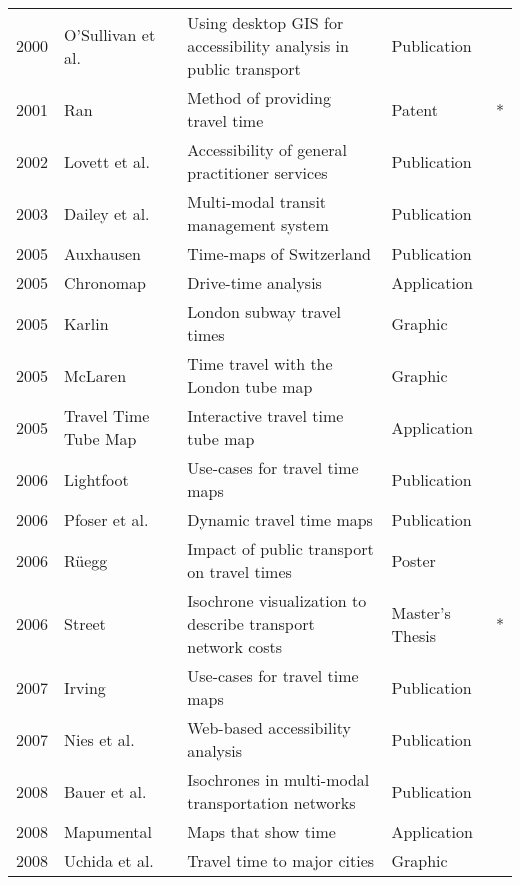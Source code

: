 \begin{table}[htb]
\begin{tabular}{r|l|l|l|c}
        2000 & O'Sullivan et al. \cite{o2000using} & Using desktop GIS for accessibility analysis in public transport  & Publication  & \\
        2001 & Ran \cite{ran2001method} &  Method of providing travel time  & Patent & * \\
        2002 & Lovett et al. \cite{lovett2002car} & Accessibility of general practitioner services  & Publication  & \\
        2003 & Dailey et al. \cite{dailey2003design} &  Multi-modal transit management system & Publication  & \\
        2005 & Auxhausen \cite{axhausen2005zeitkarten} & Time-maps of Switzerland  & Publication  & \\
        2005 & Chronomap \cite{Chronomap} & Drive-time analysis  & Application  & \\
        2005 & Karlin \cite{Karlin2005}  & London subway travel times  & Graphic & \\
        2005 & McLaren \cite{McLaren2005} & Time travel with the London tube map  & Graphic  & \\
        2005 & Travel Time Tube Map \cite{Carden2006} & Interactive travel time tube map  & Application  & \\
        2006 & Lightfoot \cite{Lightfoot2006} & Use-cases for travel time maps  &  Publication  & \\
        2006 & Pfoser et al. \cite{pfoser2006dynamic} &  Dynamic travel time maps & Publication  & \\
        2006 & Rüegg \cite{Ruegg2006} & Impact of public transport on travel times  & Poster & \\
        2006 & Street \cite{street2006timecontours} & Isochrone visualization to describe transport network costs  & Master's Thesis  & * \\
        2007 & Irving \cite{Irving2007} & Use-cases for travel time maps  & Publication  & \\
        2007 & Nies et al. \cite{neis2007webbasierte} & Web-based accessibility analysis  & Publication  & \\
        2008 & Bauer et al. \cite{bauer2008computing} & Isochrones in multi-modal transportation networks  & Publication  & \\
        2008 & Mapumental \cite{Mapumental}  &  Maps that show time & Application  & \\
        2008 & Uchida et al. \cite{Uchida2008} & Travel time to major cities  & Graphic  & \\

\end{tabular}
\end{table}
